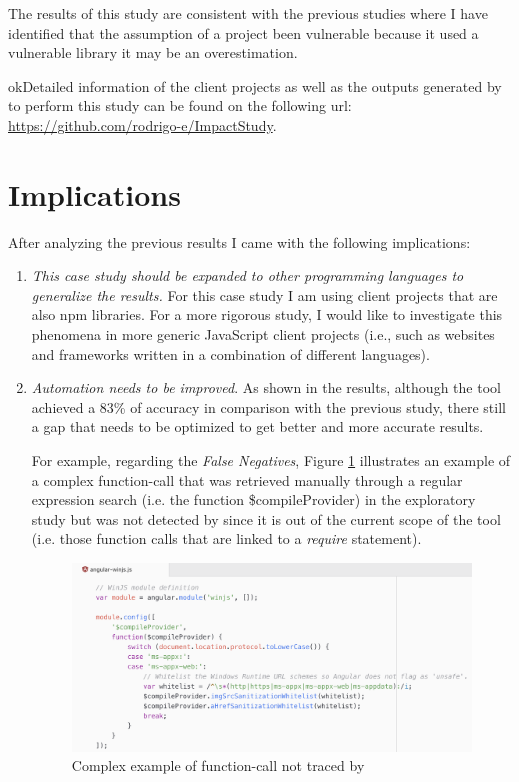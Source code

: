 The results of this study are consistent with the previous studies where I have identified that the assumption of a project been vulnerable because it used a vulnerable library it may be an overestimation.

okDetailed information of the client projects as well as the outputs generated by \tool[] to perform this study can be found on the following url: \url{https://github.com/rodrigo-e/ImpactStudy}.


\section{Implications}

After analyzing the previous results I came with the following implications:
\begin{enumerate}
    \item \textit{This case study should be expanded to other programming languages to generalize the results.}
    For this case study I am using client projects that are also npm libraries. 
    For a more rigorous study, I would like to investigate this phenomena in more generic JavaScript client projects (i.e., such as websites and frameworks written in a combination of different languages).
    
    \item \textit{Automation needs to be improved}. As shown in the results, although the tool achieved a 83\% of accuracy in comparison with the previous study, there still a gap that needs to be optimized to get better and more accurate results.
    
    For example, regarding the \textit{False Negatives}, Figure \ref{fig:falseNegativeExample} illustrates an example of a complex function-call that was retrieved manually through a regular expression search (i.e. the function \$compileProvider) in the exploratory study but was not detected by \tool[] since it is out of the current scope of the tool (i.e. those function calls that are linked to a \textit{require} statement).

\begin{figure}[ht]
\centering
\includegraphics[width=1\textwidth]{images/false_negatives_reason.png}
\caption{Complex example of function-call not traced by \tool[]}
\label{fig:falseNegativeExample}
\end{figure}
    

\end{enumerate}
